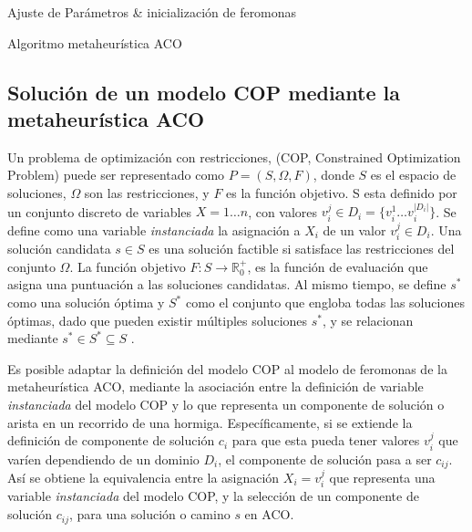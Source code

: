 \begin{algorithm}[H]
\SetAlgoLined
 Ajuste de Par\'ametros \& inicializaci\'on de feromonas\;
 \caption{Algoritmo metaheur\'istica ACO}\label{ACO-Algo}
\end{algorithm}



\subsection{Soluci\'on de un modelo COP mediante la metaheur\'istica ACO}

Un problema de optimización con restricciones, (COP, Constrained Optimization Problem) puede ser representado como $P = (S, \Omega, F)$, donde $S$ es el espacio de soluciones, $\Omega$ son las restricciones, y $F$ es la funci\'on objetivo. S esta definido por un conjunto discreto de variables $X = 1 \dotsc n$, con valores $v_{i}^{j} \in D_{i} = \{v_{i}^{1} \dotsc  v_{i}^{|D_{i}|}\}$. Se define como una variable {\it instanciada} la asignaci\'on a $X_i$ de un valor $v_{i}^{j} \in D_i$. Una solución candidata $s \in S$ es una soluci\'on factible si satisface las restricciones del conjunto $\Omega$. La funci\'on objetivo $F: S\rightarrow \mathbb R_{0}^{+}$, es la funci\'on de evaluaci\'on que asigna una puntuaci\'on a las soluciones candidatas. Al mismo tiempo, se define $s^{*}$ como una soluci\'on \'optima y $S^{*}$ como el conjunto que engloba todas las soluciones \'optimas, dado que pueden existir m\'ultiples soluciones $s^{*}$, y se relacionan mediante $s^{*} \in S^{*} \subseteq S $ \citep[ver][]{socha2008ant}.

Es posible adaptar la definici\'on del modelo COP al modelo de feromonas de la metaheur\'istica ACO, mediante la asociaci\'on entre la definici\'on de variable {\it instanciada} del modelo COP y lo que representa un componente de soluci\'on o arista en un recorrido de una hormiga. 
Espec\'ificamente, si se extiende la definici\'on de componente de soluci\'on $c_{i}$ para que esta pueda tener valores $v_{i}^{j}$ que var\'ien dependiendo de un dominio $D_i$, el componente de soluci\'on pasa a ser $c_{ij}$. As\'i se obtiene la equivalencia entre la asignaci\'on $X_i = v_{i}^{j}$ que representa una variable {\it instanciada} del modelo COP, y la selecci\'on de un componente de soluci\'on $c_{ij}$,  para una soluci\'on o camino $s$ en ACO\citep{socha2008ant}.



